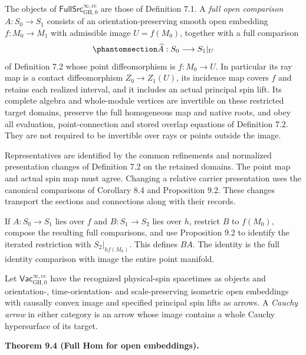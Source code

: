 \documentclass[
  english,
  11pt,
  reqno]{amsart}
\makeatletter
\newcommand{\pandocstatementheading}[1]{%
  \par\if@nobreak\else
    \addpenalty{\@beginparpenalty}%
    \addvspace{.5\baselineskip plus .2\baselineskip minus .2\baselineskip}%
  \fi
  {\normalfont\bfseries #1\par}%
  \nobreak\@afterindenttrue\@afterheading
}
\makeatother
\begin{document}
The objects of \(\mathsf{FullSrc}^{\infty,\mathrm{cc}}_{\mathrm{GH},0}\)
are those of Definition 7.1. A \emph{full open comparison}
\(A:S_0\to S_1\) consists of an orientation-preserving smooth open
embedding \(f:M_0\to M_1\) with admissible image \(U=f(M_0)\), together
with a full comparison
\begin{equation}\protect\phantomsection\label{eq:global-source-open-comparison}{
\widehat A:S_0\longrightarrow S_1|_U
}\end{equation} of Definition 7.2 whose point diffeomorphism is
\(f:M_0\to U\). In particular its ray map is a contact diffeomorphism
\(Z_0\to Z_1(U)\), its incidence map covers \(f\) and retains each
realized interval, and it includes an actual principal spin lift. Its
complete algebra and whole-module vertices are invertible on these
restricted target domains, preserve the full homogeneous map and native
roots, and obey all evaluation, point-connection and stored overlap
equations of Definition 7.2. They are not required to be invertible over
rays or points outside the image.

Representatives are identified by the common refinements and normalized
presentation changes of Definition 7.2 on the retained domains. The
point map and actual spin map must agree. Changing a relative carrier
presentation uses the canonical comparisons of Corollary 8.4 and
Proposition 9.2. These changes transport the sections and connections
along with their records.

If \(A:S_0\to S_1\) lies over \(f\) and \(B:S_1\to S_2\) lies over
\(h\), restrict \(B\) to \(f(M_0)\), compose the resulting full
comparisons, and use Proposition 9.2 to identify the iterated
restriction with \(S_2|_{hf(M_0)}\). This defines \(B A\). The identity
is the full identity comparison with image the entire point manifold.

Let \(\mathsf{Vac}^{\infty,\mathrm{cc}}_{\mathrm{GH},0}\) have the
recognized physical-spin spacetimes as objects and orientation-,
time-orientation- and scale-preserving isometric open embeddings with
causally convex image and specified principal spin lifts as arrows. A
\emph{Cauchy arrow} in either category is an arrow whose image contains
a whole Cauchy hypersurface of its target.

\pandocstatementheading{\protect{}\label{thm:global-full-source-embedding-hom}Theorem 9.4 (Full Hom for open embeddings).}
\end{document}
